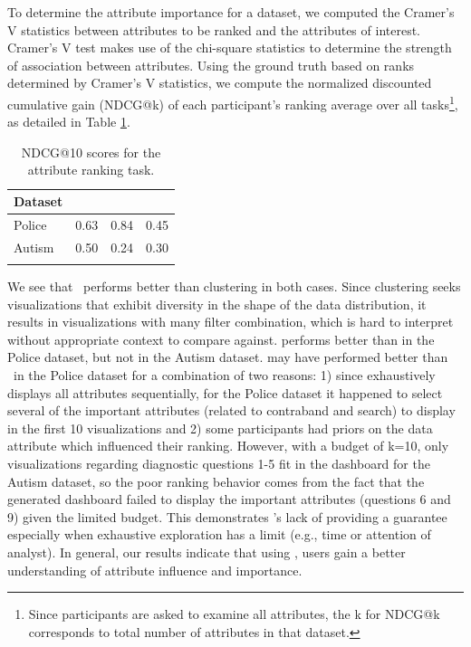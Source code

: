 To determine the attribute importance for a dataset, we computed the Cramer's V statistics between attributes to be ranked and the attributes of interest. Cramer's V test makes use of the chi-square statistics to determine the strength of association between attributes. Using the ground truth based on ranks determined by Cramer's V statistics, we compute the normalized discounted cumulative gain (NDCG@k) of each participant's ranking average over all tasks\footnote{Since participants are asked to examine all attributes, the k for NDCG@k corresponds to total number of attributes in that dataset.}, as detailed in Table \ref{table:ndcgRankingResult}.
\begin{table}[ht!]
	\centering
	\begin{tabular}{lrrr}
	\hline
	 Dataset   &   \system &  \BFS &  \cluster   \\
	\hline
	 Police    &      0.63 &       \cellcolor{blue!25}0.84 &  0.45 \\
	 Autism    &      \cellcolor{blue!25}0.50 &       0.24&0.30   \\
	\hline
	\label{table:ndcg_ranking_result}
	\end{tabular}
	\caption{NDCG@10 scores for the attribute ranking task.}
	\vspace{-20pt}
    \label{table:ndcgRankingResult}
\end{table}
We see that \system\ performs better than clustering in both cases. Since clustering seeks visualizations that exhibit diversity in the shape of the data distribution, it results in visualizations with many filter combination, which is hard to interpret without appropriate context to compare against. \BFS performs better than \system in the Police dataset, but not in the Autism dataset. \BFS may have performed better than \system\ in the Police dataset for a combination of two reasons: 1) since \BFS exhaustively displays all attributes sequentially, for the Police dataset it happened to select several of the important attributes (related to contraband and search) to display in the first 10 visualizations and 2) some participants had priors on the data attribute which influenced their ranking. However, with a budget of k=10, only visualizations regarding diagnostic questions 1-5 fit in the dashboard for the Autism dataset, so the poor ranking behavior comes from the fact that the \BFS generated dashboard failed to display the important attributes (questions 6 and 9) given the limited budget. This demonstrates \BFS's lack of providing a guarantee especially when exhaustive exploration has a limit (e.g., time or attention of analyst). In general, our results indicate that using \system, users gain a better understanding of attribute influence and importance.
